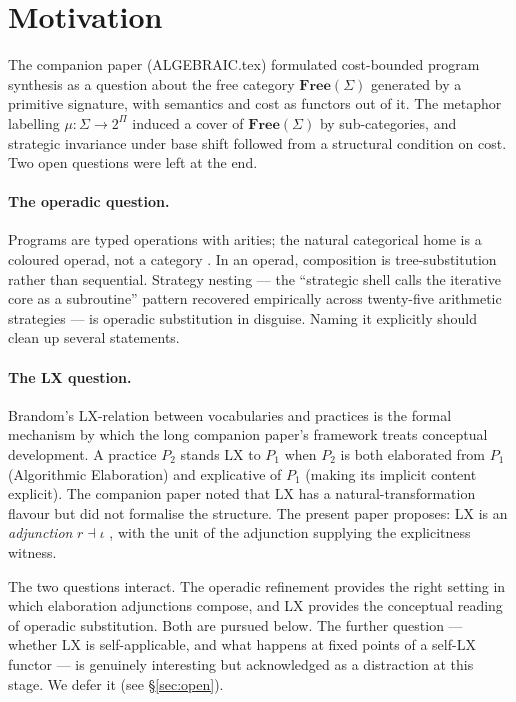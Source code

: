 \documentclass[11pt]{article}
\begin{document}
\section{Motivation}

The companion paper (ALGEBRAIC.tex) formulated cost-bounded program
synthesis as a question about the free category $\mathbf{Free}(\Sigma)$
generated by a primitive signature, with semantics and cost as
functors out of it. The metaphor labelling $\mu : \Sigma \to 2^\Pi$
induced a cover of $\mathbf{Free}(\Sigma)$ by sub-categories, and
strategic invariance under base shift followed from a structural
condition on cost. Two open questions were left at the end.

\paragraph{The operadic question.}
Programs are typed operations with arities; the natural categorical
home is a coloured operad, not a category \parencite{leinster2004}.
In an operad, composition is tree-substitution rather than sequential.
Strategy nesting — the ``strategic shell calls the iterative core as
a subroutine'' pattern recovered empirically across twenty-five
arithmetic strategies — is operadic substitution in disguise. Naming
it explicitly should clean up several statements.

\paragraph{The LX question.}
Brandom's LX-relation between vocabularies and practices
\parencite{brandom2008meaning} is the formal mechanism by which the
long companion paper's framework treats conceptual development. A
practice $P_2$ stands LX to $P_1$ when $P_2$ is both elaborated from
$P_1$ (Algorithmic Elaboration) and explicative of $P_1$ (making its
implicit content explicit). The companion paper noted that LX has a
natural-transformation flavour but did not formalise the structure.
The present paper proposes: LX is an \emph{adjunction}
$r \dashv \iota$ \parencite{maclane1998}, with the unit of the
adjunction supplying the explicitness witness.

The two questions interact. The operadic refinement provides the
right setting in which elaboration adjunctions compose, and LX provides the
conceptual reading of operadic substitution. Both are pursued below.
The further question — whether LX is self-applicable, and what
happens at fixed points of a self-LX functor — is genuinely
interesting but acknowledged as a distraction at this stage. We
defer it (see \S\ref{sec:open}).
\end{document}
